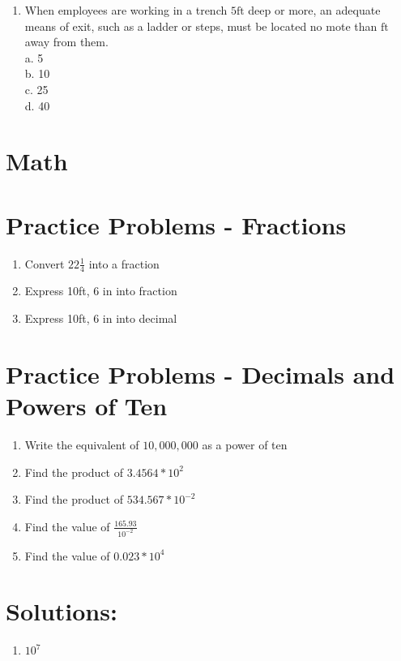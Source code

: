 \documentclass[10pt]{article}
\begin{document}
\begin{enumerate}
\begin{enumerate}
\begin{enumerate}
  \item When employees are working in a trench $5 \mathrm{ft}$ deep or more, an adequate means of exit, such as a ladder or steps, must be located no mote than $\mathrm{ft}$ away from them.\\
a. 5\\
b. 10\\
c. 25\\
d. 40\\

\end{enumerate}


\newpage
\section{Math}
\section{Practice Problems - Fractions}
\begin{enumerate}
  \item Convert $22 \frac{1}{4}$ into a fraction

  \item Express 10ft, 6 in into fraction

  \item Express 10ft, 6 in into decimal

\end{enumerate}

\section{Practice Problems - Decimals and Powers of Ten}
\begin{enumerate}
  \item Write the equivalent of $10,000,000$ as a power of ten

  \item Find the product of $3.4564 * 10^{2}$

  \item Find the product of $534.567 * 10^{-2}$

  \item Find the value of $\frac{165.93}{10^{-2}}$

  \item Find the value of $0.023 * 10^{4}$

\end{enumerate}

\section{Solutions:}
\begin{enumerate}
  \item $10^{7}$


\end{enumerate}
\end{enumerate}
\end{enumerate}
\end{document}
